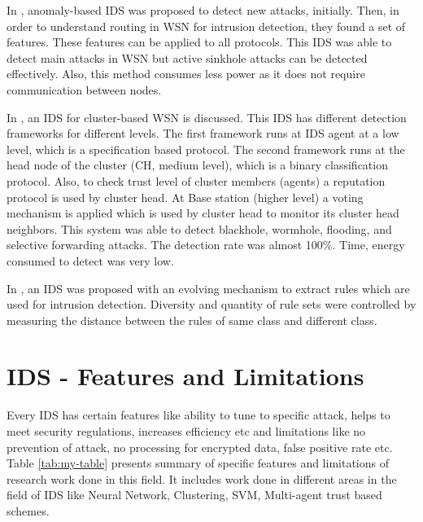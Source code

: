 \par
In \cite{eik2006intrusion}, anomaly-based IDS was proposed to detect new attacks, initially. Then, in order to understand routing in WSN for intrusion detection, they found a set of features. These features can be applied to all protocols. This IDS was able to detect main attacks in WSN but active sinkhole attacks can be detected effectively. Also, this method consumes less power as it does not require communication between nodes.
\par
In \cite{sedjelmaci2013efficient}, an IDS for cluster-based WSN is discussed. This IDS has different detection frameworks for different levels. The first framework runs at IDS agent at a low level, which is a specification based protocol. The second framework runs at the head node of the cluster (CH, medium level), which is a binary classification protocol. Also, to check trust level of cluster members (agents) a reputation protocol is used by cluster head. At Base station (higher level) a voting mechanism is applied which is used by cluster head to monitor its cluster head neighbors. This system was able to detect blackhole, wormhole, flooding, and selective forwarding attacks. The detection rate was almost 100\%. Time, energy consumed to detect was very low.
\par
In \cite{lu2018intrusion}, an IDS was proposed with an evolving mechanism to extract rules which are used for intrusion detection. Diversity and quantity of rule sets were controlled by measuring the distance between the rules of same class and different class.

\section{IDS - Features and Limitations}
\noindent
Every IDS has certain features like ability to tune to specific attack, helps to meet security regulations, increases efficiency etc and limitations like no prevention of attack, no processing for encrypted data, false positive rate etc. Table \ref{tab:my-table} presents summary of specific features and limitations of research work done in this field. It includes work done in different areas in the field of IDS like Neural Network, Clustering, SVM, Multi-agent trust based schemes.

